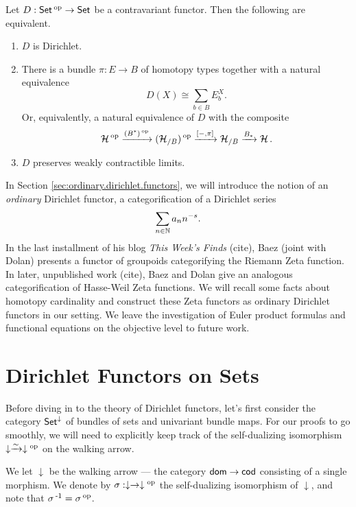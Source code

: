 \begin{thm}\label{thm:dirichlet.type.characterization}
Let $D : \operatorname{\mathsf{{Set}}}\operatorname{^\textnormal{op}} \to \operatorname{\mathsf{{Set}}}$  be a contravariant functor. Then the following are
equivalent.
\begin{enumerate}
\item $D$ is Dirichlet. 
\item There is a bundle $\pi : E \to B$ of homotopy types together with a natural equivalence
  $$D(X) \cong \sum_{b \in B} E_b^X.$$
  Or, equivalently, a natural equivalence of $D$ with the composite
  $$\operatorname{\mathcal{H}}\operatorname{^\textnormal{op}} \xrightarrow{(B^{\ast})\operatorname{^\textnormal{op}}} (\operatorname{\mathcal{H}}_{/B})\operatorname{^\textnormal{op}} \xrightarrow{[-, \pi]} \operatorname{\mathcal{H}}_{/B}
  \xrightarrow{B_{\ast}} \operatorname{\mathcal{H}}.$$
\item $D$ preserves weakly contractible limits.
\end{enumerate}
\end{thm}

In Section \ref{sec:ordinary.dirichlet.functors}, we will introduce the notion
of an \emph{ordinary} Dirichlet functor, a categorification of a Dirichlet
series
$$\sum_{n \in \operatorname{\mathbb{N}}} a_n n^{-s}.$$
In the last installment of his blog \emph{This Week's Finds} (cite), Baez (joint with
Dolan) presents a functor of groupoids categorifying the Riemann Zeta function.
In later, unpublished work (cite), Baez and Dolan give an analogous
categorification of Hasse-Weil Zeta functions. We will recall some facts about
homotopy cardinality and construct these Zeta functors as ordinary Dirichlet
functors in our setting. We leave the investigation of Euler product formulas
and functional equations on the objective level to future work.

\begin{acknowledgements}

\end{acknowledgements}


\section{Dirichlet Functors on Sets} \label{sec:set.level}

Before diving in to the theory of Dirichlet functors, let's first consider the
category $\operatorname{\mathsf{{Set}}}^{\mathbin{\downarrow}}$ of bundles of sets and univariant bundle maps. For our
proofs to go smoothly, we will need to explicitly keep track of the
self-dualizing isomorphism $\downarrow \xrightarrow{\sim} \downarrow\operatorname{^\textnormal{op}}$ on the walking arrow.

\begin{defn}
  We let $\downarrow$ be the walking arrow --- the category $\mathsf{{dom}} \to
  \mathsf{{cod}}$ consisting of a single morphism. We denote by $\sigma : \downarrow
  \to \downarrow\operatorname{^\textnormal{op}}$ the self-dualizing isomorphism of $\downarrow$, and note
  that $\sigma\operatorname{^{-1}} = \sigma\operatorname{^\textnormal{op}}$.
\end{defn}

